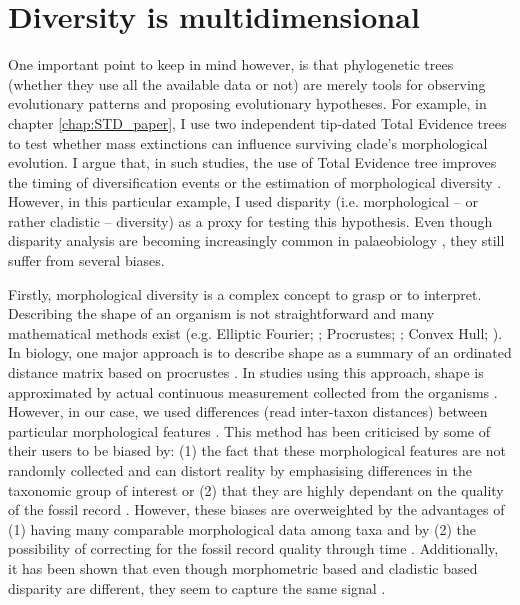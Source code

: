 \section{Diversity is multidimensional}
One important point to keep in mind however, is that phylogenetic trees (whether they use all the available data or not) are merely tools for observing evolutionary patterns and proposing evolutionary hypotheses.
For example, in chapter \ref{chap:STD_paper}, I use two independent tip-dated Total Evidence trees to test whether mass extinctions can influence surviving clade's morphological evolution.
I argue that, in such studies, the use of Total Evidence tree improves the timing of diversification events \citep[][; which is a crucial aspect when studying effect of mass extinctions which are finites points in time]{ronquista2012} or the estimation of morphological diversity \citep[increasing accuracy in reconstructing node's ancestral characters;][]{Finarelli2006}.
However, in this particular example, I used disparity (i.e. morphological -- or rather cladistic -- diversity) as a proxy for testing this hypothesis.
Even though disparity analysis are becoming increasingly common in palaeobiology \citep[e.g.]{Butler2012,brusattedinosaur2012,toljagictriassic-jurassic2013,brusattegradual2014,bensonfaunal2014,Claddis,Close2015}, they still suffer from several biases.

Firstly, morphological diversity is a complex concept to grasp or to interpret.
Describing the shape of an organism is not straightforward and many mathematical methods exist (e.g. Elliptic Fourier; \citealt{Fourier1982}; Procrustes; \citealt{JamesRohlf1993129}; Convex Hull; \citealt{ANDREW1979216}).
In biology, one major approach is to describe shape as a summary of an ordinated distance matrix based on procrustes \citep[i.e. a geometric morphometric approach][]{zelditch2012geometric}.
In studies using this approach, shape is approximated by actual continuous measurement collected from the organisms \citep[e.g.][]{friedmanexplosive2010,hopkinsdecoupling2013,finlay2015morphological}.
However, in our case, we used differences (read inter-taxon distances) between particular morphological features \citep[e.g.][]{foote1997evolution,Wills2001,Wesley-Hunt2005}.
This method has been criticised by some of their users to be biased by: (1) the fact that these morphological features are not randomly collected and can distort reality by emphasising differences in the taxonomic group of interest \citep{Hopkins24032015} or (2) that they are highly dependant on the quality of the fossil record \citep{Butler2012}.
However, these biases are overweighted by the advantages of (1) having many comparable morphological data among taxa \citep{Brusatte12092008} and by (2) the possibility of correcting for the fossil record quality through time \citep{Butler2012}.
Additionally, it has been shown that even though morphometric based and cladistic based disparity are different, they seem to capture the same signal \citep{foth2012different,hetherington2015cladistic}.


